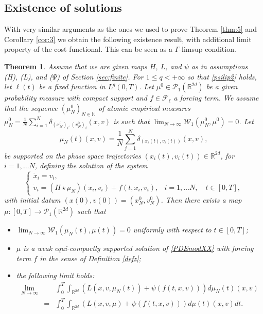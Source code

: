 \documentclass[11pt]{article}
\theoremstyle{plain}
\newtheorem{theorem}{Theorem}[section]
\theoremstyle{definition}
\theoremstyle{remark}
\numberwithin{equation}{section}
\newcommand{\Ga}{\Gamma}
\begin{document}
\subsection{Existence of solutions}

With very similar arguments as the ones we used to prove Theorem \ref{thm:5} and Corollary \ref{cor:3} we obtain the following existence result, with additional limit property of the cost functional. This can be seen as a $\Ga$-limsup condition.

\begin{theorem}\label{thm:6} 
Assume that we are given maps $H$, $L$, and $\psi$ as in assumptions (H), (L), and ($\Psi$) of Section \ref{sec:finite}. For $1\le q<+\infty$ so that \eqref{psilip2} holds, let $\ell(t)$ be a fixed function in $L^q(0,T)$.
Let $\mu^0 \in \mathcal P_1(\mathbb R^{2d})$ be a given probability measure with compact support and $f \in \mathcal F_\ell$ a forcing term. We assume that the sequence
$(\mu^0_N)_{N \in \mathbb N}$ of atomic empirical measures  $\mu^0_N = \frac{1}{N} \sum_{i=1}^N \delta_{(x_N^0)_i,(v_N^0)_i}(x,v)$ is such that $\lim_{N \to \infty} \mathcal W_1(\mu^0_N,\mu^0)=0$. Let 
\begin{equation}\label{empsolNN}
\mu_N(t)(x,v) = \frac{1}{N} \sum_{j=1}^N \delta_{(x_i(t),v_i(t))}(x,v),
\end{equation}
be supported on the phase space trajectories $(x_i(t),v_i(t)) \in \mathbb R^{2 d}$, for $i=1,\dots N$, defining the solution 
of the system
\begin{equation}\label{NNmodel}
\left \{
\begin{array}{ll}
\dot x_i = v_i, & \\
\dot v_i = ( H \star \mu_N)(x_i,v_i) + f(t,x_i,v_i), & i=1,\dots N, \quad t \in [0,T],
\end{array}
\right.
\end{equation}
with initial datum $(x(0),v(0))=(x_N^0,v_N^0)$. Then there exists  a map $\mu:[0,T] \to \mathcal P_1(\mathbb R^{2d})$ such that
\begin{itemize}
\item[(i)] $\lim_{N \to \infty} \mathcal W_1(\mu_{N}(t), \mu(t))=0$ uniformly with respect to $t \in [0,T]$;
\item[(ii)] $\mu$ is a weak equi-compactly supported solution of \eqref{PDEmodXX} with forcing term $f$ in the sense of Definition \ref{defz};
\item[(iii)] the following limit holds:
\begin{eqnarray}
 \lim_{N \to \infty} && \int_0^T \int_{\mathbb R^{2d}} (L(x,v,\mu_{N}(t)) + \psi(f(t,x,v))) d\mu_{N}(t)(x,v)  \nonumber \\ 
&= & \int_0^T \int_{\mathbb R^{2d}} (L(x,v,\mu) + \psi(f(t,x,v))) d\mu(t)(x,v)dt. \label{Gammalimsup}
\end{eqnarray}
\end{itemize}

\end{theorem}
\end{document}

